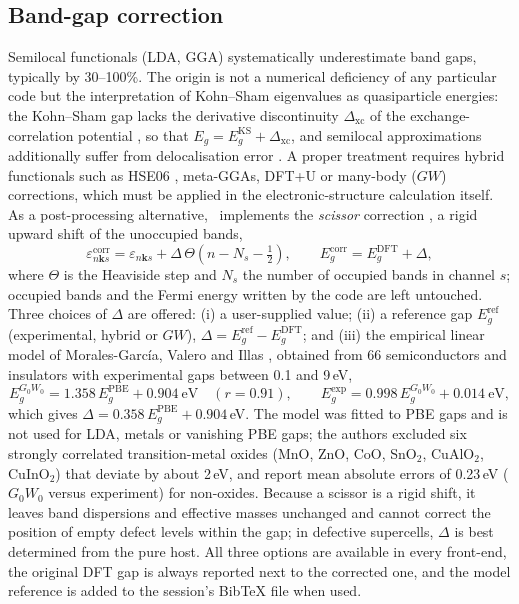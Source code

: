\subsection{Band-gap correction}\label{sec:gapcorr}
Semilocal functionals (LDA, GGA) systematically underestimate band gaps, typically by 30–100\%. The origin is not a numerical deficiency of any particular code but the interpretation of Kohn–Sham eigenvalues as quasiparticle energies: the Kohn–Sham gap lacks the derivative discontinuity $\Delta_\mathrm{xc}$ of the exchange-correlation potential \cite{perdew1983,sham1983}, so that $E_g=E_g^\mathrm{KS}+\Delta_\mathrm{xc}$, and semilocal approximations additionally suffer from delocalisation error \cite{morisanchez2008}. A proper treatment requires hybrid functionals such as HSE06 \cite{heyd2003}, meta-GGAs, DFT+U or many-body ($GW$) corrections, which must be applied in the electronic-structure calculation itself. As a post-processing alternative, \BMR\ implements the \emph{scissor} correction \cite{levine1989}, a rigid upward shift of the unoccupied bands,
\begin{equation}
\varepsilon^\mathrm{corr}_{n\bm{k} s}=\varepsilon_{n\bm{k} s}+\Delta\,\Theta(n-N_s-\tfrac12),\qquad E_g^\mathrm{corr}=E_g^\mathrm{DFT}+\Delta,
\end{equation}
where $\Theta$ is the Heaviside step and $N_s$ the number of occupied bands in channel $s$; occupied bands and the Fermi energy written by the code are left untouched. Three choices of $\Delta$ are offered: (i) a user-supplied value; (ii) a reference gap $E_g^\mathrm{ref}$ (experimental, hybrid or $GW$), $\Delta=E_g^\mathrm{ref}-E_g^\mathrm{DFT}$; and (iii) the empirical linear model of Morales-García, Valero and Illas \cite{morales2017}, obtained from 66 semiconductors and insulators with experimental gaps between 0.1 and 9\,eV,
\begin{equation}
E_g^{G_0W_0}=1.358\,E_g^\mathrm{PBE}+0.904\ \mathrm{eV}\quad(r=0.91),\qquad E_g^\mathrm{exp}=0.998\,E_g^{G_0W_0}+0.014\ \mathrm{eV},
\end{equation}
which gives $\Delta=0.358\,E_g^\mathrm{PBE}+0.904$\,eV. The model was fitted to PBE gaps and is not used for LDA, metals or vanishing PBE gaps; the authors excluded six strongly correlated transition-metal oxides (MnO, ZnO, CoO, SnO$_2$, CuAlO$_2$, CuInO$_2$) that deviate by about 2\,eV, and report mean absolute errors of 0.23\,eV ($G_0W_0$ versus experiment) for non-oxides. Because a scissor is a rigid shift, it leaves band dispersions and effective masses unchanged and cannot correct the position of empty defect levels within the gap; in defective supercells, $\Delta$ is best determined from the pure host. All three options are available in every front-end, the original DFT gap is always reported next to the corrected one, and the model reference is added to the session's BibTeX file when used.


